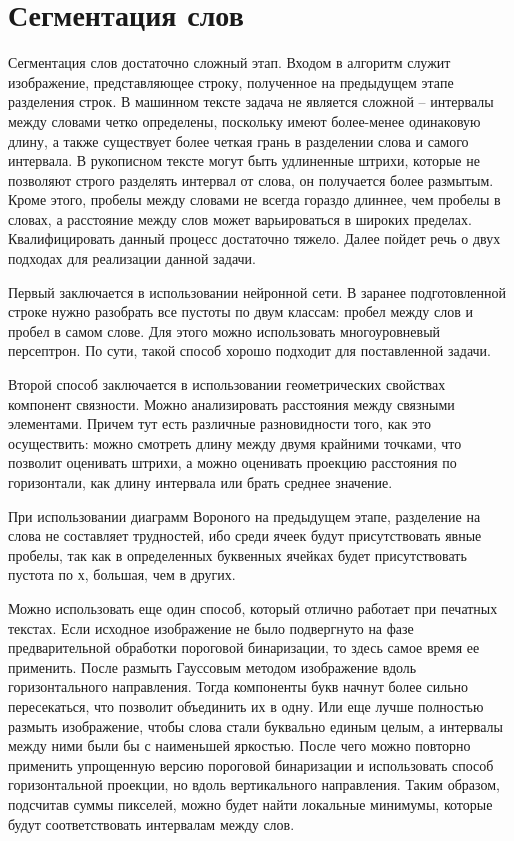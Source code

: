 \section{Сегментация слов}

Сегментация слов достаточно сложный этап. Входом в алгоритм служит изображение, представляющее строку, полученное на предыдущем этапе разделения строк. В машинном тексте задача не является сложной – интервалы между словами четко определены, поскольку имеют более-менее одинаковую длину, а также существует более четкая грань в разделении слова и самого интервала. В рукописном тексте могут быть удлиненные штрихи, которые не позволяют строго разделять интервал от слова, он получается более размытым. Кроме этого, пробелы между словами не всегда гораздо длиннее, чем пробелы в словах, а расстояние между слов может варьироваться в широких пределах. Квалифицировать данный процесс достаточно тяжело. Далее пойдет речь о двух подходах для реализации данной задачи.

Первый заключается в использовании нейронной сети. В заранее подготовленной строке нужно разобрать все пустоты по двум классам: пробел между слов и пробел в самом слове. Для этого можно использовать многоуровневый персептрон. По сути, такой способ хорошо подходит для поставленной задачи.

Второй способ заключается в использовании геометрических свойствах компонент связности. Можно анализировать расстояния между связными элементами. Причем тут есть различные разновидности того, как это осуществить: можно смотреть длину между двумя крайними точками, что позволит оценивать штрихи, а можно оценивать проекцию расстояния по горизонтали, как длину интервала или брать среднее значение.

При использовании диаграмм Вороного на предыдущем этапе, разделение на слова не составляет трудностей, ибо среди ячеек будут присутствовать явные пробелы, так как в определенных буквенных ячейках будет присутствовать пустота по х, большая, чем в других.

Можно использовать еще один способ, который отлично работает при печатных текстах. Если исходное изображение не было подвергнуто на фазе предварительной обработки пороговой бинаризации, то здесь самое время ее применить. После размыть Гауссовым методом изображение вдоль горизонтального направления. Тогда компоненты букв начнут более сильно пересекаться, что позволит объединить их в одну. Или еще лучше полностью размыть изображение, чтобы слова стали буквально единым целым, а интервалы между ними были бы с наименьшей яркостью. После чего можно повторно применить упрощенную версию пороговой бинаризации и использовать способ горизонтальной проекции, но вдоль вертикального направления. Таким образом, подсчитав суммы пикселей, можно будет найти локальные минимумы, которые будут соответствовать интервалам между слов.\cite{kak}

